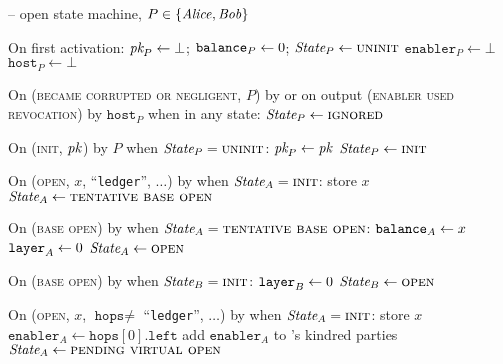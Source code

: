 \begin{center}
  \begin{systembox}{\fchan{} -- open state machine, $P \in \{\mathit{Alice}, \mathit{Bob}\}$}
    \begin{algorithmic}[1]
      \State On first activation: 
      \label{code:functionality:open:boot}
      \Indent
        \State $\textit{pk}_{P} \gets \bot$; $\texttt{balance}_{P} \gets 0$; $\itistate_P \gets
        \textsc{uninit}$
        \State $\texttt{enabler}_P \gets \bot$ 
        \State $\texttt{host}_P \gets \bot$ 
      \EndIndent
      \Statex

      \State On (\textsc{became corrupted or negligent}, $P$) by \adversary or
      on output (\textsc{enabler used revocation}) by $\texttt{host}_P$ when in
      any state:
      \label{code:functionality:open:when-ignored}
      \Indent
        \State $\itistate_P \gets \textsc{ignored}$
      \EndIndent
      \Statex

      \State On (\textsc{init}, $\textit{pk}_{}$) by $P$ when
      $\itistate_P = \textsc{uninit}$:
      \Indent
        \State $\textit{pk}_{P} \gets \textit{pk}_{}$
        \State $\itistate_P \gets \textsc{init}$
      \EndIndent
      \Statex

      \State On (\textsc{open}, $x$, ``\texttt{ledger}'', $\dots$) by \alice
      when $\itistate_A = \textsc{init}$:
      \Indent
        \State store $x$
        \label{code:functionality:open:store}
        \State $\itistate_A \gets \textsc{tentative base open}$
      \EndIndent
      \Statex

      \State On (\textsc{base open}) by \adversary when $\itistate_A =
      \textsc{tentative base open}$:
      \Indent
        \State $\texttt{balance}_{A} \gets x$
        \label{code:functionality:open:base-balance}
        \State $\texttt{layer}_{A} \gets 0$
        \State $\itistate_A \gets \textsc{open}$
      \EndIndent
      \Statex

      \State On (\textsc{base open}) by \adversary when $\itistate_B =
      \textsc{init}$:
      \label{code:functionality:open:when-open-bob}
      \Indent
        \State $\texttt{layer}_{B} \gets 0$
        \State $\itistate_B \gets \textsc{open}$
      \EndIndent
      \Statex

      \State On (\textsc{open}, $x$, $\texttt{hops} \neq$ ``\texttt{ledger}'',
      $\dots$) by \alice when $\itistate_A = \textsc{init}$:
      \Indent
        \State store $x$
        \State $\texttt{enabler}_A \gets \texttt{hops}[0].\texttt{left}$
        \State add $\texttt{enabler}_A$ to \alice's kindred parties
        \State $\itistate_A \gets \textsc{pending virtual open}$
      \EndIndent
      \Statex


\end{algorithmic}
\end{systembox}
\end{center}
